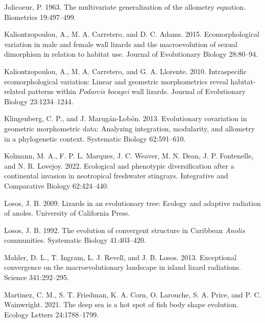 \documentclass[
  11pt,
]{article}
\newlength{\cslhangindent}
\newlength{\cslentryspacingunit} %
\newenvironment{CSLReferences}[2] %
 {%
  \setlength{\parindent}{0pt}
  \ifodd #1
  \let\oldpar\par
  \def\par{\hangindent=\cslhangindent\oldpar}
  \fi
  \setlength{\parskip}{#2\cslentryspacingunit}
 }%
 {}
\begin{document}
\begin{CSLReferences}{1}{0}
\leavevmode{}%
Jolicoeur, P. 1963. The multivariate generalization of the allometry
equation. Biometrics 19:497--499.

\leavevmode{}%
Kaliontzopoulou, A., M. A. Carretero, and D. C. Adams. 2015.
Ecomorphological variation in male and female wall lizards and the
macroevolution of sexual dimorphism in relation to habitat use. Journal
of Evolutionary Biology 28:80--94.

\leavevmode{}%
Kaliontzopoulou, A., M. A. Carretero, and G. A. Llorente. 2010.
Intraspecific ecomorphological variation: Linear and geometric
morphometrics reveal habitat-related patterns within \emph{{P}odarcis
bocagei} wall lizards. Journal of Evolutionary Biology 23:1234--1244.

\leavevmode{}%
Klingenberg, C. P., and J. Marugán-Lobón. 2013. Evolutionary covariation
in geometric morphometric data: Analyzing integration, modularity, and
allometry in a phylogenetic context. Systematic Biology 62:591--610.

\leavevmode{}%
Kolmann, M. A., F. P. L. Marques, J. C. Weaver, M. N. Dean, J. P.
Fontenelle, and N. R. Lovejoy. 2022. Ecological and phenotypic
diversification after a continental invasion in neotropical freshwater
stingrays. Integrative and Comparative Biology 62:424--440.

\leavevmode{}%
Losos, J. B. 2009. Lizards in an evolutionary tree: Ecology and adaptive
radiation of anoles. University of California Press.

\leavevmode{}%
Losos, J. B. 1992. The evolution of convergent structure in {C}aribbean
\emph{{A}nolis} communities. Systematic Biology 41:403--420.

\leavevmode{}%
Mahler, D. L., T. Ingram, L. J. Revell, and J. B. Losos. 2013.
Exceptional convergence on the macroevolutionary landscape in island
lizard radiations. Science 341:292--295.

\leavevmode{}%
Martinez, C. M., S. T. Friedman, K. A. Corn, O. Larouche, S. A. Price,
and P. C. Wainwright. 2021. The deep sea is a hot spot of fish body
shape evolution. Ecology Letters 24:1788--1799.


\end{CSLReferences}
\end{document}
